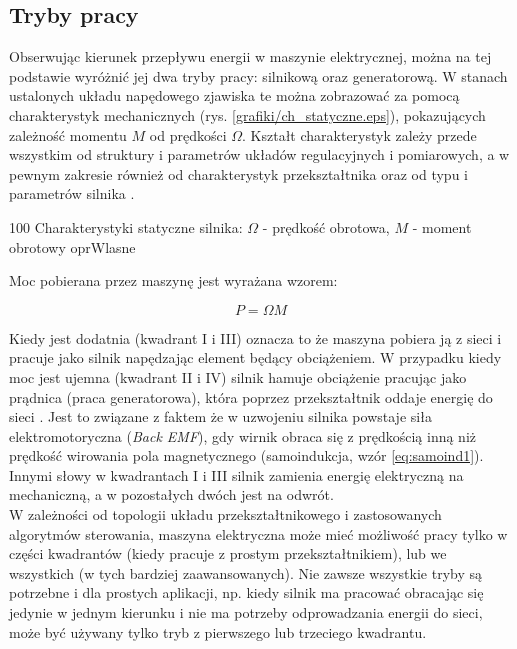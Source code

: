 \subsection{Tryby pracy}

Obserwując kierunek przepływu energii w maszynie elektrycznej, można na tej podstawie wyróżnić jej dwa tryby pracy: silnikową oraz generatorową. W stanach ustalonych układu napędowego zjawiska te można zobrazować za pomocą charakterystyk mechanicznych (rys. \ref{grafiki/ch_statyczne.eps}), pokazujących zależność momentu $ M $ od prędkości $ \Omega $. Kształt charakterystyk zależy przede wszystkim od struktury i parametrów układów regulacyjnych i pomiarowych, a w pewnym zakresie również od charakterystyk przekształtnika oraz od typu i parametrów silnika \cite{zawirski}.

	{100}
	{Charakterystyki statyczne silnika: $ \Omega $ - prędkość obrotowa, $ M $ - moment obrotowy}
	{oprWlasne}
	
Moc pobierana przez maszynę jest wyrażana wzorem:

\begin{equation} \label{eq:chs1}
	P = \Omega M
\end{equation}

Kiedy jest dodatnia (kwadrant I i III) oznacza to że maszyna pobiera ją z sieci i pracuje jako silnik napędzając element będący obciążeniem. W przypadku kiedy moc jest ujemna (kwadrant II i IV) silnik hamuje obciążenie pracując jako prądnica (praca generatorowa), która poprzez przekształtnik oddaje energię do sieci \cite{ecn_luty_2012}. Jest to związane z faktem że w uzwojeniu silnika powstaje siła elektromotoryczna ({\it Back EMF}), gdy wirnik obraca się z prędkością inną niż prędkość wirowania pola magnetycznego (samoindukcja, wzór \ref{eq:samoind1}). Innymi słowy w kwadrantach I i III silnik zamienia energię elektryczną na mechaniczną, a w pozostałych dwóch jest na odwrót. \\
W zależności od topologii układu przekształtnikowego i zastosowanych algorytmów sterowania, maszyna elektryczna może mieć możliwość pracy tylko w części kwadrantów (kiedy pracuje z prostym przekształtnikiem), lub we wszystkich (w tych bardziej zaawansowanych). Nie zawsze wszystkie tryby są potrzebne i dla prostych aplikacji, np. kiedy silnik ma pracować obracając się jedynie w jednym kierunku i nie ma potrzeby odprowadzania energii do sieci, może być używany tylko tryb z pierwszego lub trzeciego kwadrantu.









